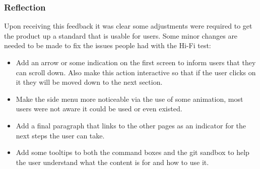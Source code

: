 \subsubsection{Reflection}
Upon receiving this feedback it was clear some adjustments were required to get the product up a standard that is usable for users. Some minor changes are needed to be made to fix the issues people had with the Hi-Fi test:
\begin{itemize}
	\item Add an arrow or some indication on the first screen to inform users that they can scroll down. Also make this action interactive so that if the user clicks on it they will be moved down to the next section.
	\item Make the side menu more noticeable via the use of some animation, most users were not aware it could be used or even existed.
	\item Add a final paragraph that links to the other pages as an indicator for the next steps the user can take.
	\item Add some tooltips to both the command boxes and the \gls{git} sandbox to help the user understand what the content is for and how to use it.
\end{itemize}





